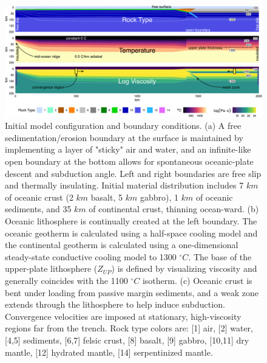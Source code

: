 \begin{landscape}


\begin{figure}[htbp]

{\centering \includegraphics[width=1\linewidth,]{assets/figs/chpt2/fig1} 

}

\caption[Initial model configuration and boundary conditions]{Initial model configuration and boundary conditions. (a) A free sedimentation/erosion boundary at the surface is maintained by implementing a layer of "sticky" air and water, and an infinite-like open boundary at the bottom allows for spontaneous oceanic-plate descent and subduction angle. Left and right boundaries are free slip and thermally insulating. Initial material distribution includes 7 $km$ of oceanic crust (2 $km$ basalt, 5 $km$ gabbro), 1 $km$ of oceanic sediments, and 35 $km$ of continental crust, thinning ocean-ward. (b) Oceanic lithosphere is continually created at the left boundary. The oceanic geotherm is calculated using a half-space cooling model and the continental geotherm is calculated using a one-dimensional steady-state conductive cooling model to 1300 $^{\circ}C$. The base of the upper-plate lithosphere ($Z_{UP}$) is defined by visualizing viscosity and generally coincides with the 1100 $^{\circ}C$ isotherm. (c) Oceanic crust is bent under loading from passive margin sediments, and a weak zone extends through the lithosphere to help induce subduction. Convergence velocities are imposed at stationary, high-viscosity regions far from the trench. Rock type colors are: [1] air, [2] water, [4,5] sediments, [6,7] felsic crust, [8] basalt, [9] gabbro, [10,11] dry mantle, [12] hydrated mantle, [14] serpentinized mantle.}\label{fig:init}
\end{figure}


\end{landscape}

